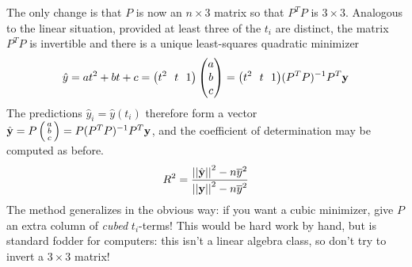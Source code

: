 The only change is that $P$ is now an $n\times 3$ matrix so that $P^TP$ is $3\times 3$. Analogous to the linear situation, provided at least three of the $t_i$ are distinct, the matrix $P^TP$ is invertible and there is a unique least-squares quadratic minimizer
\[
	\hat y=at^2+bt+c=\bigl(t^2\ \ t\ \ 1\bigr)\threevec a bc =\bigl(t^2\ \ t\ \ 1\bigr)(P^TP)^{-1}P^T\vy
\]
The predictions $\hat y_i=\hat y(t_i)$ therefore form a vector $\hat{{\mathbf{y}}}=P\left(\begin{smallmatrix}a\\b\\c\end{smallmatrix}\right)=P(P^TP)^{-1}P^T{\mathbf{y}}$, and the coefficient of determination may be computed as before.
\[
	R^2=\frac{\left| \left| \hat{{\mathbf{y}}}\right|\right|^2-n\overline{y}^2}{\left| \left| {\mathbf{y}}\right|\right|^2-n\overline{y}^2}
\]
\smallbreak
The method generalizes in the obvious way: if you want a cubic minimizer, give $P$ an extra column of \emph{cubed} $t_i$-terms! This would be hard work by hand, but is standard fodder for computers: this isn't a linear algebra class, so don't try to invert a $3\times 3$ matrix!


\goodbreak


